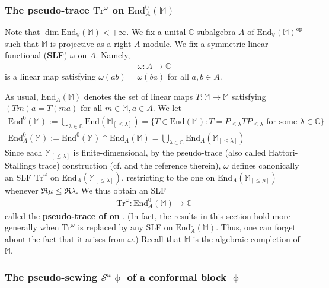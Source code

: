 \documentclass[11pt,b5paper,notitlepage]{article}
\theoremstyle{definition}
\theoremstyle{plain}
\newcommand{\ovl}{\overline}
\newcommand{\Tr}{\mathrm{Tr}}
\newcommand{\End}{\mathrm{End}} %
\newcommand{\Vbb}{\mathbb V}
\newcommand{\Mbb}{\mathbb M}
\newcommand{\Cbb}{\mathbb C}
\newcommand{\<}{\left\langle}
\renewcommand{\>}{\right\rangle}
\newcommand{\MS}{\mathcal{S}}
\numberwithin{equation}{section}
\begin{document}
\subsubsection{The pseudo-trace $\Tr^\omega$ on $\End^0_A(\Mbb)$}

Note that $\dim\End_\Vbb(\Mbb)<+\infty$. We fix a unital $\Cbb$-subalgebra $A$ of $\End_\Vbb(\Mbb)^\mathrm{op}$ such that $\Mbb$ is projective as a right $A$-module. We fix a symmetric linear functional (\textbf{SLF}) $\omega$ on $A$. Namely, 
\begin{align*}
\omega:A\rightarrow\Cbb
\end{align*}
is a linear map satisfying $\omega(ab)=\omega(ba)$ for all $a,b\in A$. 

As usual, $\End_A(\Mbb)$ denotes the set of linear maps $T:\Mbb\rightarrow\Mbb$ satisfying $(Tm)a=T(m a)$ for all $m\in\Mbb,a\in A$. We let
\begin{gather*}
\End^0(\Mbb):=\bigcup_{\lambda\in\Cbb} \End(\Mbb_{[\leq\lambda]})=\{T\in\End(\Mbb):T=P_{\leq\lambda}TP_{\leq\lambda}\text{ for some }\lambda\in\Cbb\}\\
\End^0_A(\Mbb):=\End^0(\Mbb)\cap\End_A(\Mbb)=\bigcup_{\lambda\in\Cbb}\End_A(\Mbb_{[\leq\lambda]})
\end{gather*}
Since each $\Mbb_{[\leq\lambda]}$ is finite-dimensional, by the pseudo-trace (also called Hattori-Stallings trace) construction (cf. \cite{Ari10} and the reference therein), $\omega$ defines canonically an SLF $\Tr^\omega$ on $\End_A(\Mbb_{[\leq\lambda]})$, restricting to the one on $\End_A(\Mbb_{[\leq\mu]})$ whenever $\Re\mu\leq\Re\lambda$. We thus obtain an SLF
\begin{align*}
\Tr^\omega:\End_A^0(\Mbb)\rightarrow\Cbb
\end{align*}
called the \textbf{pseudo-trace of \pmb{$\omega$} on \pmb{$\End_A^0(\Mbb)$}}. (In fact, the results in this section hold more generally when $\Tr^\omega$ is replaced by any SLF on $\End_A^0(\Mbb)$. Thus, one can forget about the fact that it arises from $\omega$.) Recall that $\ovl{\Mbb}$ is the algebraic completion of $\Mbb$.


\subsubsection{The pseudo-sewing $\MS^\omega\upphi$ of a conformal block $\upphi$}
\end{document}
